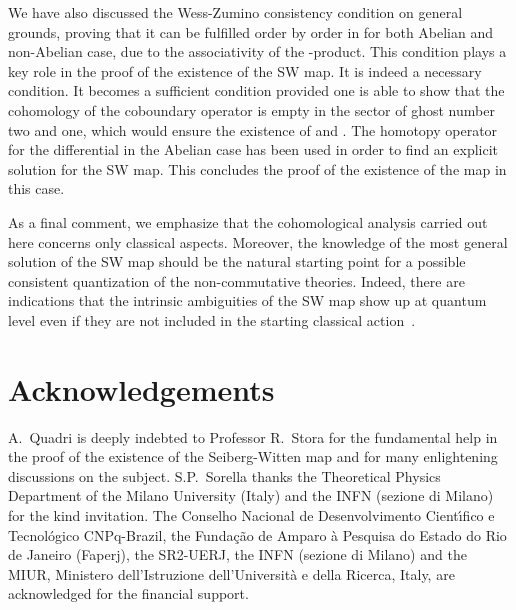 \documentclass[a4paper,12pt]{article}
\begin{document}
We have also discussed the Wess-Zumino consistency condition on general
 grounds, proving that it can be fulfilled order by order in \myHighlight{$\theta$}\coordHE{}
 for both Abelian and non-Abelian case, due to the associativity of the
 \myHighlight{$\star$}\coordHE{}-product.
This condition plays a key role in the proof of the existence of the SW map.
It is indeed a necessary condition.
It becomes a sufficient condition provided one is able to show that the
 cohomology of the coboundary operator \myHighlight{$\Delta$}\coordHE{} is empty in the sector of
 ghost number two and one, which would ensure the existence of \coordHE{} and \coordHE{}.
The homotopy operator for the differential \myHighlight{$\Delta$}\coordHE{}
 in the Abelian case has been used in order to find an explicit solution for
 the SW map.
This concludes the proof of the existence of the map in this case.

As a final comment, we emphasize that the cohomological analysis carried out
 here concerns only classical aspects.
Moreover, the knowledge of the most general solution of the SW map should be
 the natural starting point for a possible consistent quantization of the 
 non-commutative theories.
Indeed, there are indications that the intrinsic ambiguities of the SW map
 show up at quantum level even if they are not included in the starting
 classical action~\cite{Jurco:2001rq,Bichl:2001cq}.
 
\section*{Acknowledgements}

A.~Quadri is deeply indebted to Professor R.~Stora for the fundamental help
in the proof of the existence of the Seiberg-Witten map and for many
 enlightening discussions on the subject.
S.P.~Sorella thanks the Theoretical Physics Department of the Milano University
(Italy) and the INFN (sezione di Milano) for the kind invitation.
The Conselho Nacional de Desenvolvimento
Cient\'{\i}fico e Tecnol\'{o}gico CNPq-Brazil, the Funda{\c {c}}{\~{a}}o de
Amparo {\`{a}} Pesquisa do Estado do Rio de Janeiro (Faperj), the SR2-UERJ,
the INFN (sezione di Milano) and the MIUR, Ministero dell'Istruzione
 dell'Universit\`a e della Ricerca, Italy, are acknowledged for the
financial support.
\end{document}

